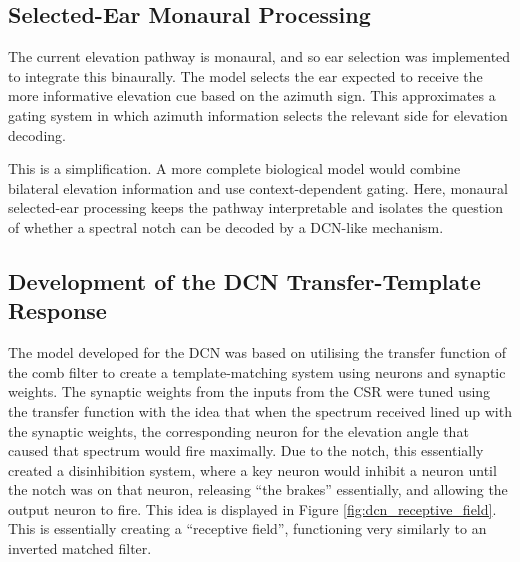 \subsection{Selected-Ear Monaural Processing}

The current elevation pathway is monaural, and so ear selection was implemented to integrate this binaurally. The model selects the ear expected to receive the more informative elevation cue based on the azimuth sign. This approximates a gating system in which azimuth information selects the relevant side for elevation decoding.

This is a simplification. A more complete biological model would combine bilateral elevation information and use context-dependent gating. Here, monaural selected-ear processing keeps the pathway interpretable and isolates the question of whether a spectral notch can be decoded by a DCN-like mechanism.

\subsection{Development of the DCN Transfer-Template Response}

The model developed for the DCN was based on utilising the transfer function of the comb filter to create a template-matching system using neurons and synaptic weights. The synaptic weights from the inputs from the CSR were tuned using the transfer function with the idea that when the spectrum received lined up with the synaptic weights, the corresponding neuron for the elevation angle that caused that spectrum would fire maximally. Due to the notch, this essentially created a disinhibition system, where a key neuron would inhibit a neuron until the notch was on that neuron, releasing ``the brakes'' essentially, and allowing the output neuron to fire. This idea is displayed in Figure \ref{fig:dcn_receptive_field}. This is essentially creating a ``receptive field'', functioning very similarly to an inverted matched filter. 

